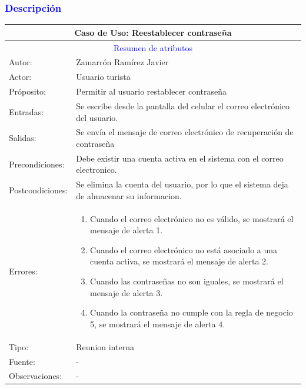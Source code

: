 \subsubsection{\textcolor{blue}{Descripción}}
\begin{tabularx}{16cm}{||l|X||}
	\hline
	\multicolumn{2}{||c||}{Caso de Uso: Reestablecer contraseña } \\
	\hline
	\multicolumn{2}{||c||}{\textcolor{blue}{Resumen de atributos}} \\
	\hline
	{Autor:} & Zamarrón Ramírez Javier \\
    \hline
	{Actor:} & Usuario turista\\
	\hline
	{Próposito:} & Permitir al usuario restablecer contraseña\\
	\hline
	{Entradas:} &  Se escribe desde la pantalla del celular el correo electrónico del usuario. \\
	\hline
	{Salidas:} & Se envía el mensaje de correo electrónico de recuperación de contraseña \\
	\hline
	{Precondiciones:} & Debe existir una cuenta activa en el sistema con el correo electronico.\\ 
	\hline
	{Postcondiciones:} & Se elimina la cuenta del usuario, por lo que el sistema deja de almacenar su informacion.\\
	\hline
	{Errores:} &\begin{minipage}{1\linewidth}
        \begin{enumerate}
            \item Cuando el correo electrónico no es válido, se mostrará el mensaje de alerta 1.
            \item Cuando el correo electrónico no está asociado a una cuenta activa, se mostrará el mensaje de alerta 2.
            \item Cuando las contraseñas no son iguales, se mostrará el mensaje de alerta 3.
            \item Cuando la contraseña no cumple con la regla de negocio 5, se mostrará el mensaje de alerta 4.
        \end{enumerate}
    \end{minipage} \\
	\hline
	{Tipo:} & Reunion interna\\
	\hline
	{Fuente:} & {-} \\
	\hline
	{Observaciones:} & {-} \\
	\hline
\end{tabularx}

